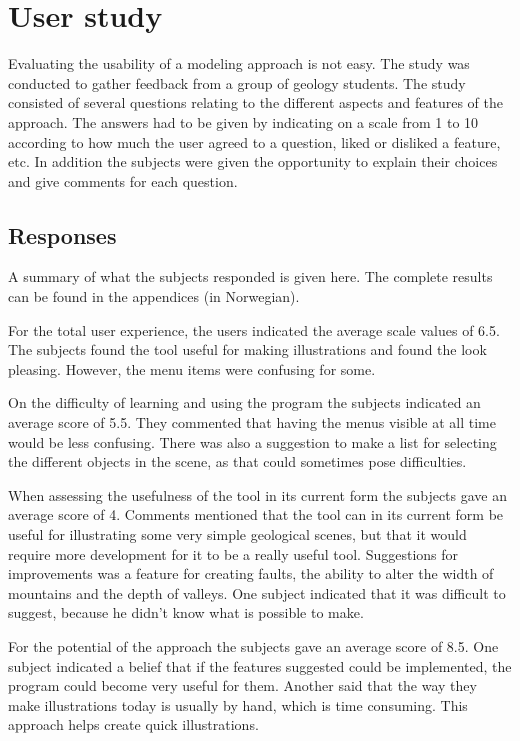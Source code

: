 \documentclass[a4paper,12pt]{report}
\begin{document}
\clearpage

\section{User study}
Evaluating the usability of a modeling approach is not easy. The study was conducted to gather feedback from a group of geology students. The study consisted of several questions relating to the different aspects and features of the approach. The answers had to be given by indicating on a scale from 1 to 10 according to how much the user agreed to a question, liked or disliked a feature, etc. In addition the subjects were given the opportunity to explain their choices and give comments for each question. 

\subsection{Responses}
A summary of what the subjects responded is given here. The complete results can be found in the appendices (in Norwegian). 

For the total user experience, the users indicated the average scale values of 6.5. The subjects found the tool useful for making illustrations and found the look pleasing. However, the menu items were confusing for some.

On the difficulty of learning and using the program the subjects indicated an average score of 5.5. They commented that having the menus visible at all time would be less confusing. There was also a suggestion to make a list for selecting the different objects in the scene, as that could sometimes pose difficulties.

When assessing the usefulness of the tool in its current form the subjects gave an average score of 4. Comments mentioned that the tool can in its current form be useful for illustrating some very simple geological scenes, but that it would require more development for it to be a really useful tool. Suggestions for improvements was a feature for creating faults, the ability to alter the width of mountains and the depth of valleys. One subject indicated that it was difficult to suggest, because he didn't know what is possible to make.

For the potential of the approach the subjects gave an average score of 8.5. One subject indicated a belief that if the features suggested could be implemented, the program could become very useful for them. Another said that the way they make illustrations today is usually by hand, which is time consuming. This approach helps create quick illustrations.
\end{document}
